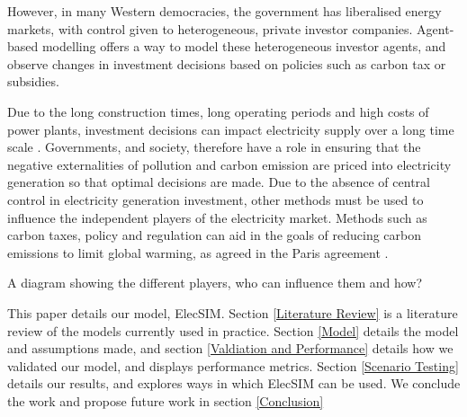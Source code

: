 However, in many Western democracies, the government has liberalised energy markets, with control given to heterogeneous, private investor companies. Agent-based modelling offers a way to model these heterogeneous investor agents, and observe changes in investment decisions based on policies such as carbon tax or subsidies.

Due to the long construction times, long operating periods and high costs of power plants, investment decisions can impact electricity supply over a long time scale \cite{Chappin2017}. Governments, and society, therefore have a role in ensuring that the negative externalities of pollution and carbon emission are priced into electricity generation so that optimal decisions are made. Due to the absence of central control in electricity generation investment, other methods must be used to influence the independent players of the electricity market. Methods such as carbon taxes, policy and regulation can aid in the goals of reducing carbon emissions to limit global warming, as agreed in the Paris agreement \cite{May2002}.

 {\color{red} A diagram showing the different players, who can influence them and how?}

This paper details our model, ElecSIM. Section \ref{Literature Review} is a literature review of the models currently used in practice. Section \ref{Model} details the model and assumptions made, and section \ref{Valdiation and Performance} details how we validated our model, and displays performance metrics. Section \ref{Scenario Testing} details our results, and explores ways in which ElecSIM can be used. We conclude the work and propose future work in section \ref{Conclusion}



